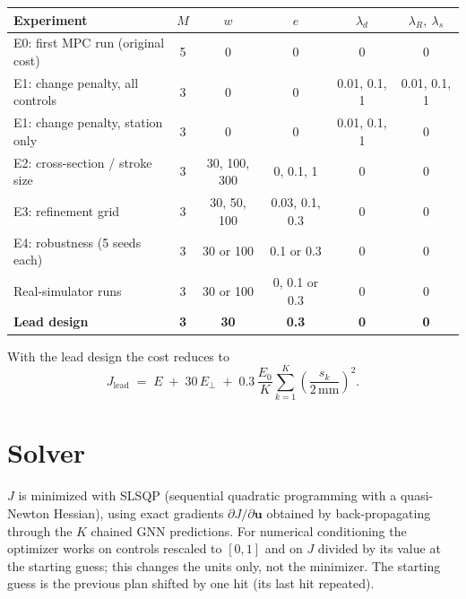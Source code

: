 \documentclass[11pt]{article}
\begin{document}
\begin{center}
\small
\renewcommand{\arraystretch}{1.25}
\begin{tabular}{@{}l c c c c c@{}}
\toprule
Experiment & $M$ & $w$ & $e$ & $\lambda_d$ & $\lambda_R,\ \lambda_s$ \\
\midrule
E0: first MPC run (original cost) & 5 & 0 & 0 & 0 & 0 \\
E1: change penalty, all controls & 3 & 0 & 0 & 0.01, 0.1, 1 & 0.01, 0.1, 1 \\
E1: change penalty, station only & 3 & 0 & 0 & 0.01, 0.1, 1 & 0 \\
E2: cross-section / stroke size & 3 & 30, 100, 300 & 0, 0.1, 1 & 0 & 0 \\
E3: refinement grid & 3 & 30, 50, 100 & 0.03, 0.1, 0.3 & 0 & 0 \\
E4: robustness (5 seeds each) & 3 & 30 or 100 & 0.1 or 0.3 & 0 & 0 \\
Real-simulator runs & 3 & 30 or 100 & 0, 0.1 or 0.3 & 0 & 0 \\
\midrule
\textbf{Lead design} & \textbf{3} & \textbf{30} & \textbf{0.3} & \textbf{0} & \textbf{0} \\
\bottomrule
\end{tabular}
\end{center}

With the lead design the cost reduces to
\begin{equation}
  J_{\text{lead}} \;=\; E \;+\; 30\, E_{\perp} \;+\; 0.3\, \frac{E_0}{K} \sum_{k=1}^{K} \left(\frac{s_k}{2\,\text{mm}}\right)^{2}.
\end{equation}

\section{Solver}

$J$ is minimized with SLSQP (sequential quadratic programming with a
quasi-Newton Hessian), using exact gradients $\partial J / \partial \mathbf{u}$
obtained by back-propagating through the $K$ chained GNN predictions. For
numerical conditioning the optimizer works on controls rescaled to $[0,1]$ and
on $J$ divided by its value at the starting guess; this changes the units only,
not the minimizer. The starting guess is the previous plan shifted by one hit
(its last hit repeated).
\end{document}
